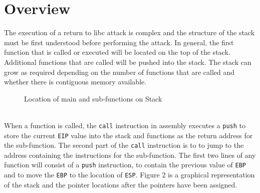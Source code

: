 \documentclass[a4paper,12pt]{article}
\makeatletter
\DeclareRobustCommand{\rvdots}{%
	\vbox{
		\baselineskip4\p@\lineskiplimit\z@
		\kern-\p@
		\hbox{.}\hbox{.}\hbox{.}
}}
\makeatother
\begin{document}
	\section{Overview}
	The execution of a return to libc attack is complex and the structure of the stack must be first understood before performing the attack. In general, the first function that is called or executed will be located on the top of the stack. Additional functions that are called will be pushed into the stack. The stack can grow as required depending on the number of functions that are called and whether there is contiguous memory available.
	\begin{figure}[!h]
		\centering
		\caption{Location of main and sub-functions on Stack}
	\end{figure}
\\When a function is called, the \texttt{call} instruction in assembly executes a \texttt{push} to store the current \texttt{EIP} value into the stack and functions as the return address for the sub-function. The second part of the \texttt{call} instruction is to to jump to the address containing the instructions for the sub-function. The first two lines of any function will consist of a \texttt{push} instruction, to contain the previous value of \texttt{EBP} and to move the \texttt{EBP} to the location of \texttt{ESP}. Figure 2 is a graphical representation of the stack and the pointer locations after the pointers have been assigned.
\end{document}
